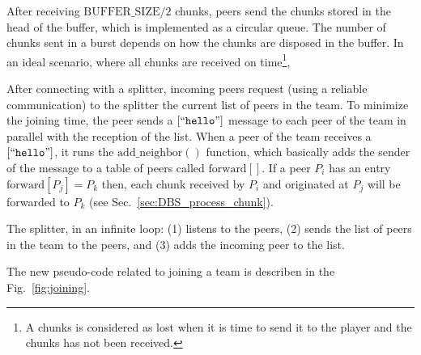 
\label{sec:cnunk_playing}

After receiving $\text{BUFFER\_SIZE}/2$ chunks, peers send the chunks
stored in the head of the buffer, which is implemented as a circular
queue. The number of chunks sent in a burst depends on how the chunks
are disposed in the buffer. In an ideal scenario, where all chunks are
received on time\footnote{A chunks is considered as lost when it is
  time to send it to the player and the chunks has not been received.}, 


After connecting with a splitter, incoming peers request (using a
reliable communication) to the splitter the current list of peers in
the team. To minimize the joining time, the peer sends a
$[``\mathtt{hello}"]$ message to each peer of the team in parallel
with the reception of the list. When a peer of the team receives a
$[``\mathtt{hello}"]$, it runs the $\text{add\_neighbor}()$ function,
which basically adds the sender of the message to a table of peers
called $\text{forward}[]$. If a peer $P_i$ has an entry
$\text{forward}[P_j]=P_k$ then, each chunk received by $P_i$ and
originated at $P_j$ will be forwarded to $P_k$ (see
Sec.~\ref{sec:DBS_process_chunk}).


The splitter, in an infinite loop: (1) listens to the peers, (2) sends
the list of peers in the team to the peers, and (3) adds the incoming peer
to the list.

\begin{figure*}
   \caption{Code related to team
    joining.\label{fig:joining}}
\end{figure*}

The new pseudo-code related to joining a team is describen in the
Fig.~\ref{fig:joining}.


